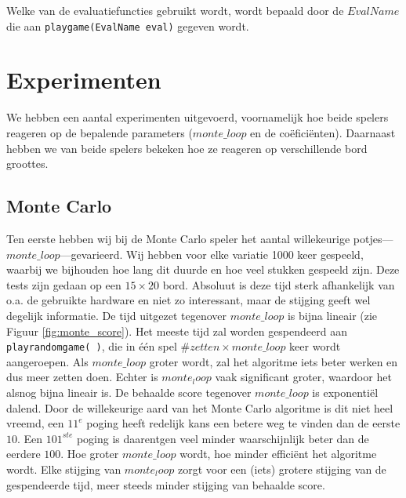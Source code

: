 \documentclass[10pt]{article}
\begin{document}
Welke van de evaluatiefuncties gebruikt wordt, wordt bepaald door de $EvalName$ die aan \texttt{playgame(EvalName eval)} gegeven wordt.

\section{Experimenten}

We hebben een aantal experimenten uitgevoerd, voornamelijk hoe beide spelers reageren op de bepalende parameters ($monte\_loop$ en de co\"efici\"enten). Daarnaast hebben we van beide spelers bekeken hoe ze reageren op verschillende bord groottes.

\subsection{Monte Carlo}
Ten eerste hebben wij bij de Monte Carlo speler het aantal willekeurige potjes---$monte\_loop$---gevarieerd. Wij hebben voor elke variatie 1000 keer gespeeld, waarbij we bijhouden hoe lang dit duurde en hoe veel stukken gespeeld zijn. Deze tests zijn gedaan op een $15 \times 20$ bord. Absoluut is deze tijd sterk afhankelijk van o.a. de gebruikte hardware en niet zo interessant, maar de stijging geeft wel degelijk informatie. De tijd uitgezet tegenover $monte\_loop$ is bijna lineair (zie Figuur \ref{fig:monte_score}). Het meeste tijd zal worden gespendeerd aan \verb+playrandomgame( )+, die in \'e\'en spel $\#zetten \times monte\_loop$ keer wordt aangeroepen. Als $monte\_loop$ groter wordt, zal het algoritme iets beter werken en dus meer zetten doen. Echter is $monte_loop$ vaak significant groter, waardoor het alsnog bijna lineair is. De behaalde score tegenover $monte\_loop$ is exponenti\"el dalend. Door de willekeurige aard van het Monte Carlo algoritme is dit niet heel vreemd, een $11^e$ poging heeft redelijk kans een betere weg te vinden dan de eerste $10$. Een $101^{ste}$ poging is daarentgen veel minder waarschijnlijk beter dan de eerdere $100$.
Hoe groter $monte\_loop$ wordt, hoe minder effici\"ent het algoritme wordt. Elke stijging van $monte_loop$ zorgt voor een (iets) grotere stijging van de gespendeerde tijd, meer steeds minder stijging van behaalde score.
\end{document}
